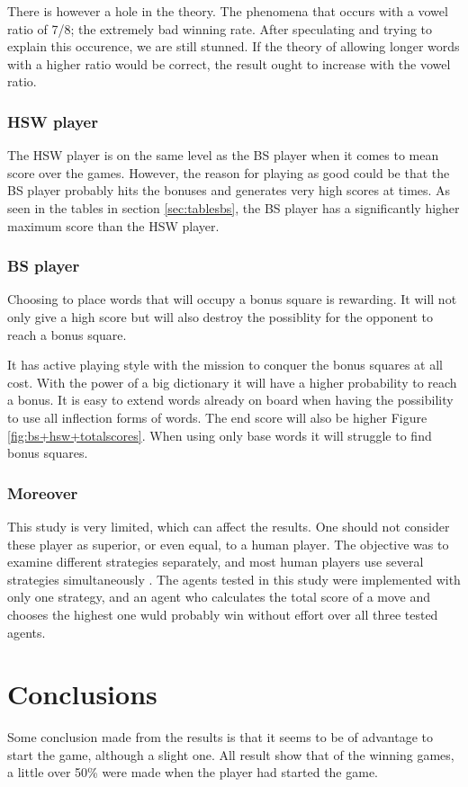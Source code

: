 \documentclass[a4paper, 12pt]{report}
\begin{document}
There is however a hole in the theory. The phenomena that occurs with a vowel ratio of 7/8; the extremely bad winning rate. After speculating and trying to explain this occurence, we are still stunned. If the theory of allowing longer words with a higher ratio would be correct, the result ought to increase with the vowel ratio.

\subsubsection{HSW player}
The HSW player is on the same level as the BS player when it comes to mean score over the games. However, the reason for playing as good could be that the BS player probably hits the bonuses and generates very high scores at times. As seen in the tables in section \ref{sec:tablesbs}, the BS player has a significantly higher maximum score than the HSW player.

\subsubsection{BS player}
Choosing to place words that will occupy a bonus square is rewarding. It will not only give a high score but will also destroy the possiblity for the opponent to reach a bonus square.

It has active playing style with the mission to conquer the bonus squares at all cost. With the power of a big dictionary it will have a higher probability to reach a bonus. It is easy to extend words already on board when having the possibility to use all inflection forms of words. The end score will also be higher Figure \ref{fig:bs+hsw+totalscores}. When using only base words it will struggle to find bonus squares. 

\subsubsection{Moreover}
This study is very limited, which can affect the results. One should not consider these player as superior, or even equal, to a human player. The objective was to examine different strategies separately, and most human players use several strategies simultaneously \cite{perfectgame}. The agents tested in this study were implemented with only one strategy, and an agent who calculates the total score of a move and chooses the highest one wuld probably win without effort over all three tested agents. 

\section{Conclusions}
Some conclusion made from the results is that it seems to be of advantage to start the game, although a slight one. All result show that of the winning games, a little over 50\% were made when the player had started the game.
\end{document}
